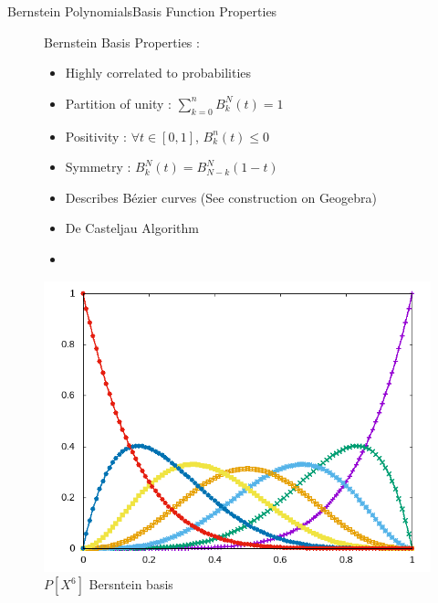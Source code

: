 \documentclass[10pt]{beamer}
\begin{document}
\begin{frame}{Bernstein Polynomials}{Basis Function Properties}
  
  \begin{figure}[H]
    \hspace{-1.75cm}
    \begin{minipage}[top]{0.60\linewidth}

      Bernstein Basis Properties :
      \begin{itemize}
      \item Highly correlated to probabilities
      \item Partition of unity : $\sum_{k=0}^nB^N_k(t)=1$
      \item Positivity : $\forall t \in [0,1]$, $B^n_k(t)\le0$
      \item Symmetry : $B^N_k(t)=B^N_{N-k}(1-t)$
      \item Describes Bézier curves (See construction on Geogebra)
      \item De Casteljau Algorithm
      \item[]
      \end{itemize}     
    \end{minipage}
    \begin{minipage}[top]{0.40\linewidth}
      \includegraphics[scale=0.3]{base_b.png}
      \caption{$P[X^6]$ Bersntein basis}
    \end{minipage}
  \end{figure}
\end{frame}
\end{document}
